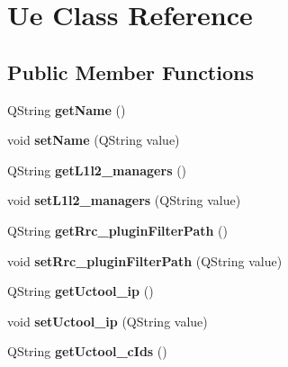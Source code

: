 \hypertarget{class_ue}{}\section{Ue Class Reference}
\label{class_ue}
\subsection*{Public Member Functions}
\begin{DoxyCompactItemize}
\item 
Q\+String {\bfseries get\+Name} ()\hypertarget{class_ue_a373abdd9b76575fd10d7663e33d3962e}{}\label{class_ue_a373abdd9b76575fd10d7663e33d3962e}

\item 
void {\bfseries set\+Name} (Q\+String value)\hypertarget{class_ue_aa4b8f5623cf668352a43fcf30601ae7f}{}\label{class_ue_aa4b8f5623cf668352a43fcf30601ae7f}

\item 
Q\+String {\bfseries get\+L1l2\+\_\+managers} ()\hypertarget{class_ue_a06ad8c42c06010f1c379d5e97e339cd6}{}\label{class_ue_a06ad8c42c06010f1c379d5e97e339cd6}

\item 
void {\bfseries set\+L1l2\+\_\+managers} (Q\+String value)\hypertarget{class_ue_aefc895d2139169b5c2c5ddeba688f728}{}\label{class_ue_aefc895d2139169b5c2c5ddeba688f728}

\item 
Q\+String {\bfseries get\+Rrc\+\_\+plugin\+Filter\+Path} ()\hypertarget{class_ue_a56a364395014c0e16209863456184a57}{}\label{class_ue_a56a364395014c0e16209863456184a57}

\item 
void {\bfseries set\+Rrc\+\_\+plugin\+Filter\+Path} (Q\+String value)\hypertarget{class_ue_a378b2c19ab092939aa5b261d01d0a0a5}{}\label{class_ue_a378b2c19ab092939aa5b261d01d0a0a5}

\item 
Q\+String {\bfseries get\+Uctool\+\_\+ip} ()\hypertarget{class_ue_ae77d0a37a0139100c54df2f24ce81f55}{}\label{class_ue_ae77d0a37a0139100c54df2f24ce81f55}

\item 
void {\bfseries set\+Uctool\+\_\+ip} (Q\+String value)\hypertarget{class_ue_a907e414b99089b491cc1778b9b72c317}{}\label{class_ue_a907e414b99089b491cc1778b9b72c317}

\item 
Q\+String {\bfseries get\+Uctool\+\_\+c\+Ids} ()\hypertarget{class_ue_aa75f1cfbe5fa0ff160a1f2dea7f02b64}{}\label{class_ue_aa75f1cfbe5fa0ff160a1f2dea7f02b64}


\end{DoxyCompactItemize}
